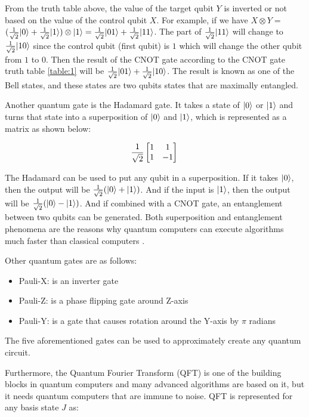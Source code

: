 \documentclass[12pt,a4paper]{article}
\DeclarePairedDelimiter\ket{\lvert}{\rangle}
\begin{document}
	From the truth table above, the value of the target qubit $Y$ is inverted or not based on the value of the control qubit $X$. For example, if we have $X \otimes Y =$ $ (\frac{1}{\sqrt2}\ket{0} + \frac{1}{\sqrt2}\ket{1}) \otimes \ket{1} = \frac{1}{\sqrt2}\ket{01} + \frac{1}{\sqrt2}\ket{11}$. The part of $\frac{1}{\sqrt2}\ket{11}$ will change to $\frac{1}{\sqrt2}\ket{10}$ since the control qubit (first qubit) is $1$ which will change the other qubit from $1$ to $0$. Then the result of the CNOT gate according to the CNOT gate truth table \ref{table:1} will be $ \frac{1}{\sqrt2}\ket{01} + \frac{1}{\sqrt2}\ket{10}$. The result is known as one of the Bell states, and these states are two qubits states that are maximally entangled.
	
	Another quantum gate is the Hadamard gate. It takes a state of $\ket{0}$ or $\ket{1}$ and turns that state into a superposition of $\ket{0}$ and $\ket{1}$, which is represented as a matrix as shown below:
	
	\begin{equation}
		\label{eqn:equation1}
		\frac{1}{\sqrt{2}} \begin{bmatrix*}
			1 & 1\\ 1 & -1
		\end{bmatrix*}\\
	\end{equation}
	
	The Hadamard can be used to put any qubit in a superposition. If it takes $\ket{0}$, then the output will be 
	$\frac{1}{\sqrt{2}} (\ket{0} +\ket{1})$. And if the input is $\ket{1}$, then the output will be $\frac{1}{\sqrt{2}} (\ket{0} -\ket{1})$. And if combined with a CNOT gate, an entanglement between two qubits can be generated. Both superposition and entanglement phenomena are the reasons why quantum computers can execute algorithms much faster than classical computers \cite{9357505}.
	
	Other quantum gates are as follows:
	\begin{itemize}
		\item Pauli-X: is an inverter gate
		\item Pauli-Z: is a phase flipping gate around Z-axis
		\item Pauli-Y: is a gate that causes rotation around the Y-axis by $\pi$ radians
	\end{itemize}
	The five aforementioned gates can be used to approximately create any quantum circuit. 
	
	Furthermore, the Quantum Fourier Transform (QFT) is one of the building blocks in quantum computers and many advanced algorithms are based on it, but it needs quantum computers that are immune to noise. QFT is represented for any basis state $J$ as:
	
\end{document}

